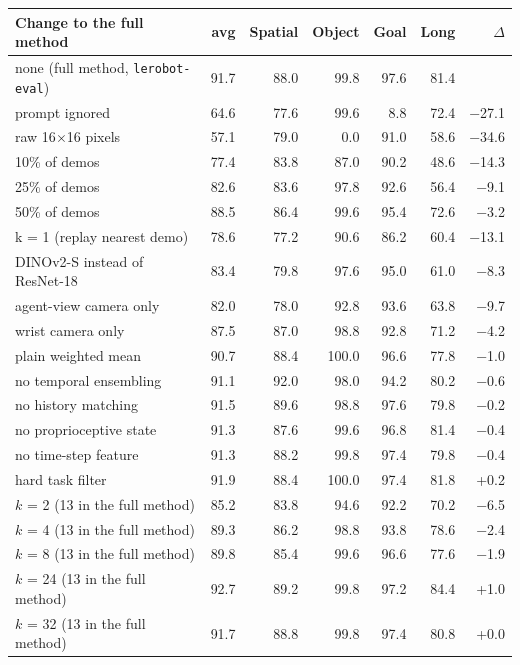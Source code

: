 \begin{tabularx}{\linewidth}{@{}X*{6}{r}@{}}
\toprule
Change to the full method & avg & Spatial & Object & Goal & Long & $\Delta$ \\
\midrule
none (full method, \texttt{lerobot-eval}) & 91.7 & 88.0 & 99.8 & 97.6 & 81.4 & \\
prompt ignored & 64.6 & 77.6 & 99.6 & 8.8 & 72.4 & −27.1 \\
raw 16$\times$16 pixels & 57.1 & 79.0 & 0.0 & 91.0 & 58.6 & −34.6 \\
10\% of demos & 77.4 & 83.8 & 87.0 & 90.2 & 48.6 & −14.3 \\
25\% of demos & 82.6 & 83.6 & 97.8 & 92.6 & 56.4 & −9.1 \\
50\% of demos & 88.5 & 86.4 & 99.6 & 95.4 & 72.6 & −3.2 \\
k = 1 (replay nearest demo) & 78.6 & 77.2 & 90.6 & 86.2 & 60.4 & −13.1 \\
DINOv2-S instead of ResNet-18 & 83.4 & 79.8 & 97.6 & 95.0 & 61.0 & −8.3 \\
agent-view camera only & 82.0 & 78.0 & 92.8 & 93.6 & 63.8 & −9.7 \\
wrist camera only & 87.5 & 87.0 & 98.8 & 92.8 & 71.2 & −4.2 \\
plain weighted mean & 90.7 & 88.4 & 100.0 & 96.6 & 77.8 & −1.0 \\
no temporal ensembling & 91.1 & 92.0 & 98.0 & 94.2 & 80.2 & −0.6 \\
no history matching & 91.5 & 89.6 & 98.8 & 97.6 & 79.8 & −0.2 \\
no proprioceptive state & 91.3 & 87.6 & 99.6 & 96.8 & 81.4 & −0.4 \\
no time-step feature & 91.3 & 88.2 & 99.8 & 97.4 & 79.8 & −0.4 \\
hard task filter & 91.9 & 88.4 & 100.0 & 97.4 & 81.8 & +0.2 \\
\midrule
$k$ = 2 (13 in the full method) & 85.2 & 83.8 & 94.6 & 92.2 & 70.2 & −6.5 \\
$k$ = 4 (13 in the full method) & 89.3 & 86.2 & 98.8 & 93.8 & 78.6 & −2.4 \\
$k$ = 8 (13 in the full method) & 89.8 & 85.4 & 99.6 & 96.6 & 77.6 & −1.9 \\
$k$ = 24 (13 in the full method) & 92.7 & 89.2 & 99.8 & 97.2 & 84.4 & +1.0 \\
$k$ = 32 (13 in the full method) & 91.7 & 88.8 & 99.8 & 97.4 & 80.8 & +0.0 \\
\bottomrule
\end{tabularx}
